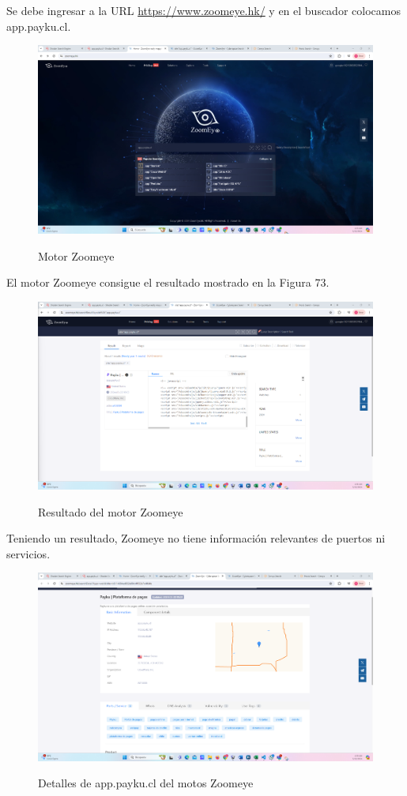 \documentclass[stu, 11pt, letterpaper, donotrepeattitle, floatsintext, natbib]{apa7}
\begin{document}
Se debe ingresar a la URL \url{https://www.zoomeye.hk/} y en el buscador colocamos app.payku.cl.

\begin{figure}[H]
    \centering
    \caption{Motor Zoomeye}
    \includegraphics[width=0.75\linewidth]{ac63.png} %
    \label{fig:OverallEffect}
\end{figure}

El motor Zoomeye consigue el resultado mostrado en la Figura 73.

\begin{figure}[H]
    \centering
    \caption{Resultado del motor Zoomeye}
    \includegraphics[width=0.75\linewidth]{ac64.png} %
    \label{fig:OverallEffect}
\end{figure}

Teniendo un resultado, Zoomeye no tiene información relevantes de puertos ni servicios.

\begin{figure}[H]
    \centering
    \caption{Detalles de app.payku.cl del motos Zoomeye}
    \includegraphics[width=0.75\linewidth]{ac65.png} %
    \label{fig:OverallEffect}
\end{figure}
\end{document}
